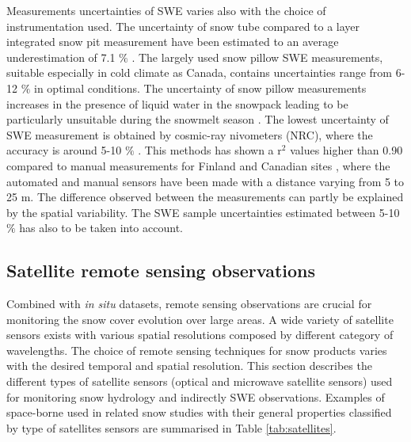 \documentclass[hydrology,article,submit,moreauthors,pdftex]{Definitions/mdpi}
\begin{document}
Measurements uncertainties of SWE varies also with the choice of instrumentation used. The uncertainty of snow tube compared to a layer integrated snow pit measurement have been estimated to an average underestimation of 7.1 $\%$ \citep{Sturm_2010}. The largely used snow pillow SWE measurements, suitable especially in cold climate as Canada, contains uncertainties range from 6-12 $\%$ in optimal conditions. The uncertainty of snow pillow measurements increases in the presence of liquid water in the snowpack leading to be particularly unsuitable during the snowmelt season \citep{Smith_2017,Engeset_2000}. The lowest uncertainty of SWE measurement is obtained by cosmic-ray nivometers (NRC), where the accuracy is around 5-10 $\%$ \citep{Lafaysse_2017, Smith_2017}. This methods has shown a r$^{2}$ values higher than 0.90 compared to manual measurements for Finland and Canadian sites \citep{Smith_2017}, where the automated and manual sensors have been made with a distance varying from 5 to 25 m. The difference observed between the measurements can partly be explained by the spatial variability. The SWE sample uncertainties estimated between 5-10 $\%$ has also to be taken into account. 



\subsection{Satellite remote sensing observations}

Combined with \textit{in situ} datasets, remote sensing observations are crucial for monitoring the snow cover evolution over large areas. A wide variety of satellite sensors exists with various spatial resolutions composed by different category of wavelengths. The choice of remote sensing techniques for snow products varies with the desired temporal and spatial resolution. This section describes the different types of satellite sensors (optical and microwave satellite sensors) used for monitoring snow hydrology and indirectly SWE observations. Examples of space-borne used in related snow studies with their general properties classified by type of satellites sensors are summarised in Table \ref{tab:satellites}.
\end{document}
